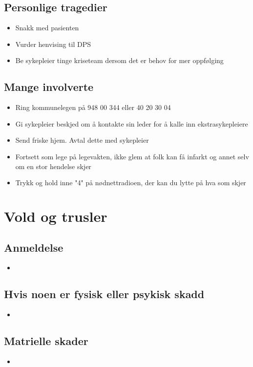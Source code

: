 \documentclass[12pt,a4paper]{memoir}
\newcommand{\pawmob}{948 00 344}
\newcommand{\ebmob}{40 20 30 04}
\begin{document}
	\section{Personlige tragedier}
		\begin{itemize}
			\item Snakk med pasienten
			\item Vurder henvising til DPS
			\item Be sykepleier tinge kriseteam dersom det er behov for mer oppfølging
		\end{itemize}
	\section{Mange involverte}
		\begin{itemize}
			\item Ring kommunelegen på \pawmob{} eller \ebmob{}
			\item Gi sykepleier beskjed om å kontakte sin leder for å kalle inn ekstrasykepleiere
			\item Send friske hjem. Avtal dette med sykepleier
			\item Fortsett som lege på legevakten, ikke glem at folk kan få infarkt og annet selv om en stor hendelse skjer
			\item Trykk og hold inne "4" på nødnettradioen, der kan du lytte på hva som skjer
		\end{itemize}

\newpage
\chapter{Vold og trusler}
	\section{Anmeldelse}
		\begin{itemize}
			\item
		\end{itemize}
	\section{Hvis noen er fysisk eller psykisk skadd}
		\begin{itemize}
			\item
		\end{itemize}
	\section{Matrielle skader} 
		\begin{itemize}
			\item
		\end{itemize}
\end{document}
